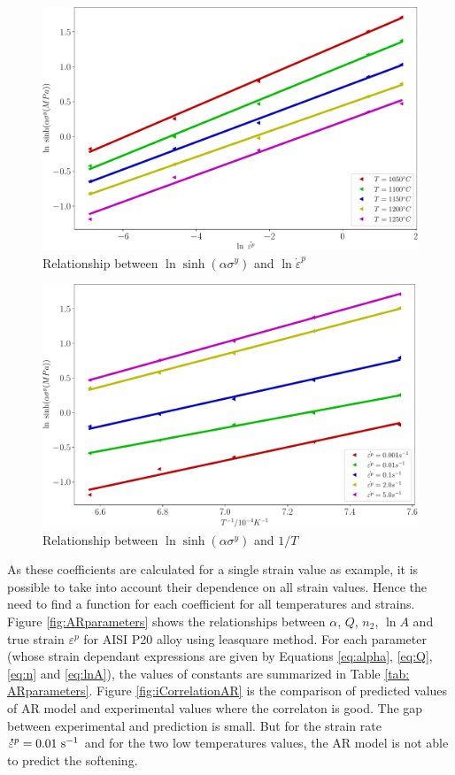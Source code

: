 \documentclass[twoside,english,1p,final,sort&compress]{elsarticle}
\theoremstyle{plain}
\newcommand{\mdot}[1]{\accentset{\mbox{\bfseries .}}{#1}}
\begin{document}
\begin{figure}[!ht]
\centering
\includegraphics[width=0.9\columnwidth]{newFigures/LnSinhE}
\caption{Relationship between $\ln \sinh(\alpha\sigma^y) $ and $\ln \dot{\varepsilon}^p$}
\label{fig:LnSinhE}
\end{figure}
\begin{figure}[!ht]
\centering
\includegraphics[width=0.9\columnwidth]{newFigures/LnSinhT}
\caption{Relationship between $\ln \sinh(\alpha\sigma^y) $ and $1/T$}
\label{fig:LnSinhT}
\end{figure}
As these coefficients are calculated for a single strain value as example, it is possible to take into account their dependence on all strain values. Hence the need to find a function for each coefficient for all temperatures and strains. Figure  \ref{fig:ARparameters} shows the relationships between $\alpha$, $Q$, $n_2$, $\ln A$ and true strain $\varepsilon^p$ for AISI P20 alloy using leasquare method. For each parameter (whose strain dependant expressions are given by Equations \ref{eq:alpha}, \ref{eq:Q}, \ref{eq:n} and \ref{eq:lnA}), the values of constants are summarized in Table \ref{tab: ARparameters}. Figure \ref{fig:iCorrelationAR} is the comparison of predicted values of AR model and experimental values where the correlaton is good. The gap between experimental and prediction is small. But for the strain rate $\mdot{\varepsilon}^p = 0.01\ \text{s}^{-1}$ and for the two low temperatures values, the AR model is not able to predict the softening.
\end{document}
